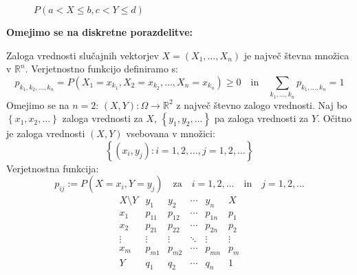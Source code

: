 \documentclass[12pt]{book}
\def\n{\noindent}
\theoremstyle{definition}
\theoremstyle{plain}
\theoremstyle{plain}
\theoremstyle{plain}
\theoremstyle{remark}
\begin{document}
\begin{figure}[H]
    \centering

    \caption{$P(a<X \leq b, c<Y \leq d)$}
    \label{fig:22}
\end{figure}

\n \textbf{Omejimo se na diskretne porazdelitve:}

\n Zaloga vrednosti slučajnih vektorjev $X=\left(X_1, \ldots, X_n\right)$ je največ števna množica v $\mathbb{R}^n$. Verjetnostno funkcijo definiramo s:
$$
p_{k_1, k_2, \ldots, k_n} = P\left(X_1=x_{k_1}, X_2=x_{k_2}, \ldots, X_n=x_{k_n}\right) \geq 0 \quad \text{in} \quad \sum_{k_1, \ldots, k_n} p_{k_1, \ldots, k_n}=1
$$
Omejimo se na $n=2$: $(X, Y): \Omega \to \mathbb{R}^2$ z največ števno zalogo vrednosti. Naj bo $\left\{x_1, x_2, \ldots\right\}$ zaloga vrednosti za $X$, $\left\{y_1, y_2, \ldots\right\}$ pa zaloga vrednosti za $Y$. Očitno je zaloga vrednosti $(X,Y)$ vsebovana v množici:
$$
\left\{\left(x_i, y_j\right): i=1,2, \ldots, j=1,2, \ldots\right\}
$$
Verjetnostna funkcija:
$$
p_{i j}:=P\left(X=x_i, Y=y_j\right) \quad \text{za} \quad i=1, 2, \ldots \quad \text{in} \quad  j=1, 2, \ldots
$$
$$
\begin{array}{c|cccc|c}
    X\setminus Y & y_1 & y_2 & \cdots & y_n & X \\
    \hline x_1 & p_{11} & p_{12} & \cdots & p_{1 n} & p_1 \\
    x_2 & p_{21} & p_{22} & \cdots & p_{2 n} & p_2 \\
    \vdots & \vdots & \vdots & \ddots & \vdots & \vdots \\
    x_m & p_{m 1} & p_{m 2} & \cdots & p_{m n} & p_m \\
    \hline Y & q_1 & q_2 & \cdots & q_n & 1
    \end{array}
$$
\end{document}
